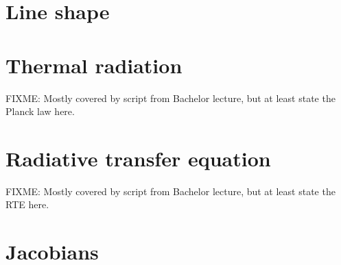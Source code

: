 \documentclass[a4paper,fleqn]{article}
\begin{document}
\section{Line shape}

\section{Thermal radiation}

FIXME: Mostly covered by script from Bachelor lecture, but at least
state the Planck law here.

\section{Radiative transfer equation}

FIXME: Mostly covered by script from Bachelor lecture, but at least
state the RTE here.

\section{Jacobians}
 
\end{document}
